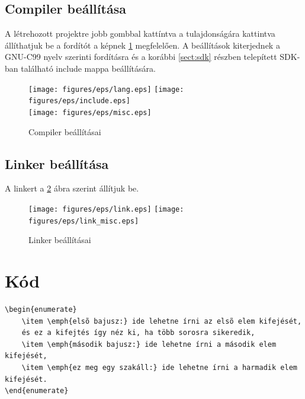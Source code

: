 \subsection{Compiler beállítása}
A létrehozott projektre jobb gombbal kattíntva a tulajdonságára kattintva
állíthatjuk be a fordítót a képnek \ref{fig:compiler} megfelelően.
A beállítások kiterjednek a GNU-C99 nyelv szerinti fordításra és a korábbi
\ref{sect:sdk} részben telepített SDK-ban található include mappa beállítására. 
\begin{figure}[H]
\centering
\texttt{[image: figures/eps/lang.eps]}\hspace{1cm}
\texttt{[image: figures/eps/include.eps]}\\\vspace{5mm}
\texttt{[image: figures/eps/misc.eps]}
\caption{Compiler beállításai} 
\label{fig:compiler}
\end{figure}

\subsection{Linker beállítása}
A linkert a \ref{fig:linker} ábra szerint állítjuk be.
\begin{figure}[H]
\centering
\texttt{[image: figures/eps/link.eps]}\hspace{1cm}
\texttt{[image: figures/eps/link\_misc.eps]}\\\vspace{5mm}
\caption{Linker beállításai} 
\label{fig:linker}
\end{figure}



\section{Kód}
\begin{lstlisting}[frame=single,float=!ht,caption=A fenti számozott felsorolás \LaTeX- forráskódja, label=listing:Example]
\begin{enumerate}
	\item \emph{elsõ bajusz:} ide lehetne írni az elsõ elem kifejését, 
	és ez a kifejtés így néz ki, ha több sorosra sikeredik,
	\item \emph{második bajusz:} ide lehetne írni a második elem kifejését,
	\item \emph{ez meg egy szakáll:} ide lehetne írni a harmadik elem kifejését.
\end{enumerate}
\end{lstlisting}


